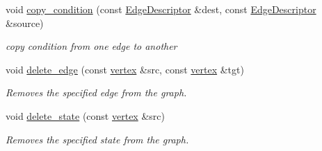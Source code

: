 \begin{DoxyCompactItemize}
void \hyperlink{classStateTransitionGraph__constructor_a7c13f3edf3fe5c1a1390fa26a80be2da}{copy\+\_\+condition} (const \hyperlink{graph_8hpp_a9eb9afea34e09f484b21f2efd263dd48}{Edge\+Descriptor} \&dest, const \hyperlink{graph_8hpp_a9eb9afea34e09f484b21f2efd263dd48}{Edge\+Descriptor} \&source)
\begin{DoxyCompactList}\small\item\em copy condition from one edge to another \end{DoxyCompactList}\item 
void \hyperlink{classStateTransitionGraph__constructor_aef603329d8b899371fcc362d53b464e7}{delete\+\_\+edge} (const \hyperlink{graph_8hpp_abefdcf0544e601805af44eca032cca14}{vertex} \&src, const \hyperlink{graph_8hpp_abefdcf0544e601805af44eca032cca14}{vertex} \&tgt)
\begin{DoxyCompactList}\small\item\em Removes the specified edge from the graph. \end{DoxyCompactList}\item 
void \hyperlink{classStateTransitionGraph__constructor_aa6076bb71d246e0acb5f04e5cd21f2ad}{delete\+\_\+state} (const \hyperlink{graph_8hpp_abefdcf0544e601805af44eca032cca14}{vertex} \&src)
\begin{DoxyCompactList}\small\item\em Removes the specified state from the graph. \end{DoxyCompactList}\end{DoxyCompactItemize}
